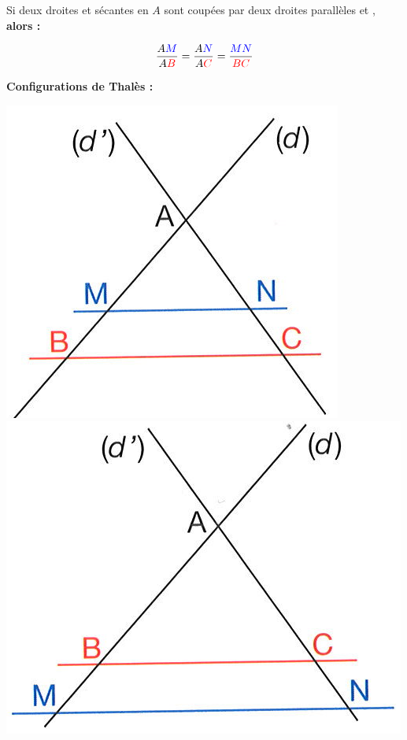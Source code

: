\documentclass[12pt,a4paper]{article}
\begin{document}
\begin{myprop}
	Si deux droites  et  sécantes en $A$ sont coupées par deux droites parallèles  et , \textbf{alors :}
		
	\begin{equation*}
		\dfrac{A\textcolor{Blue}{M}}{A\textcolor{Red}{B}}=\dfrac{A\textcolor{Blue}{N}}{A\textcolor{Red}{C}}=\dfrac{\textcolor{Blue}{MN}}{\textcolor{Red}{BC}}
	\end{equation*}
	
	\vspace*{0.5cm}
	\textbf{Configurations de Thalès :}
	\begin{multicols}{3}
		\includegraphics[scale=0.4]{./img/thales3}
		\includegraphics[scale=0.4]{./img/thales2}

\end{multicols}
\end{myprop}
\end{document}
